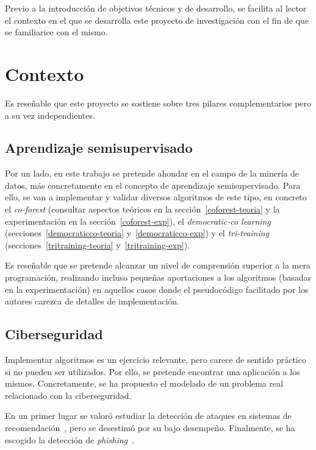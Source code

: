 
Previo a la introducción de objetivos técnicos y de desarrollo, se facilita al lector el contexto en el que se desarrolla este proyecto de investigación con el fin de que se familiarice con el mismo.

\section{Contexto}
\label{contexto}

Es reseñable que este proyecto se sostiene sobre tres pilares complementarios pero a su vez independientes.

\subsection{Aprendizaje semisupervisado}

Por un lado, en este trabajo se pretende ahondar en el campo de la minería de datos, más concretamente en el concepto de aprendizaje semisupervisado. Para ello, se van a implementar y validar diversos algoritmos de este tipo, en concreto el \textit{co-forest} (consultar aspectos teóricos en la sección~\ref{coforest-teoria} y la experimentación en la sección~\ref{coforest-exp}), el \textit{democratic-co learning} (secciones~\ref{democraticco-teoria} y~\ref{democraticco-exp}) y el \textit{tri-training} (secciones~\ref{tritraining-teoria} y~\ref{tritraining-exp}).

Es reseñable que se pretende alcanzar un nivel de comprensión superior a la mera programación, realizando incluso pequeñas aportaciones a los algoritmos (basadas en la experimentación) en aquellos casos donde el pseudocódigo facilitado por los autores carezca de detalles de implementación.

\subsection{Ciberseguridad}

Implementar algoritmos es un ejercicio relevante, pero carece de sentido práctico si no pueden ser utilizados. Por ello, se pretende encontrar una aplicación a los mismos. Concretamente, se ha propuesto el modelado de un problema real relacionado con la ciberseguridad.

En un primer lugar se valoró estudiar la detección de ataques en sistemas de recomendación~\cite{zhou2021SemisupervisedRecommendationAttack}, pero se desestimó por su bajo desempeño. Finalmente, se ha escogido la detección de \textit{phishing}~\cite{featuresPhishing2018Gupta}.

